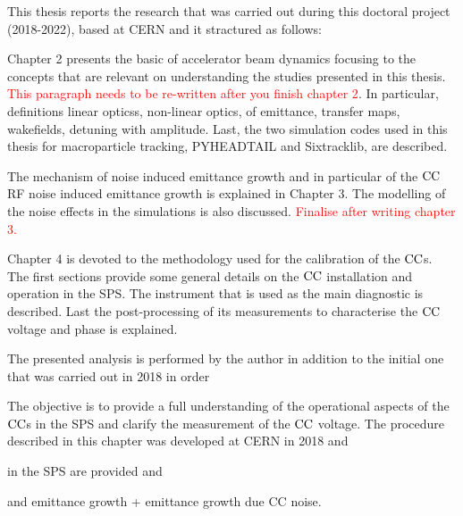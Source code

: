 This thesis reports the research that was carried out during this doctoral project (2018-2022), based at CERN and it stractured as follows:

Chapter 2 presents the basic of accelerator beam dynamics focusing to the concepts that are relevant on understanding the studies presented in this thesis. \textcolor{red}{This paragraph needs to be re-written after you finish chapter 2}. In particular, definitions linear opticss, non-linear optics, of emittance, transfer maps, wakefields, detuning with amplitude.  Last, the two simulation codes used in this thesis for macroparticle tracking, PYHEADTAIL and Sixtracklib, are described.

The mechanism of noise induced emittance growth and in particular of the ${\mathrm{CC}}$ RF noise induced emittance growth is explained in Chapter 3. The modelling of the noise effects in the simulations is also discussed.  \textcolor{red}{Finalise after writing chapter 3.}

Chapter 4 is devoted to the methodology used for the calibration of the ${\mathrm{CC}}$s. The first sections provide some general details on the ${\mathrm{CC}}$ installation and operation in the SPS. The instrument that is used as the main diagnostic is described. Last the post-processing of its measurements to characterise the ${\mathrm{CC}}$ voltage and phase is explained. %


The presented analysis is performed by the author in addition to the initial one that was carried out in 2018 in order 


The objective is to provide a full understanding of the operational aspects of the ${\mathrm{CC}}$s in the SPS and clarify the measurement of the ${\mathrm{CC}}$ voltage. 
The procedure described in this chapter was developed at CERN in 2018 and 


in the SPS are provided and 



and emittance growth + emittance growth due CC noise.